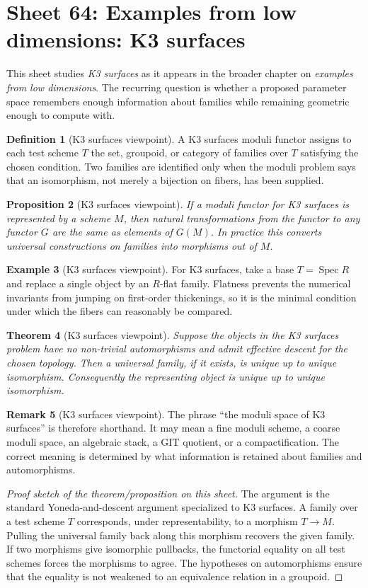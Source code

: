 \documentclass[11pt]{amsart}
\newtheorem{theorem}{Theorem}[section]
\newtheorem{proposition}[theorem]{Proposition}
\theoremstyle{definition}
\newtheorem{definition}[theorem]{Definition}
\newtheorem{example}[theorem]{Example}
\newtheorem{remark}[theorem]{Remark}
\newcommand{\Spec}{\operatorname{Spec}}
\begin{document}
\section{Sheet 64: Examples from low dimensions: K3 surfaces}
This sheet studies \emph{K3 surfaces} as it appears in the broader chapter on \emph{examples from low dimensions}.  The recurring question is whether a proposed parameter space remembers enough information about families while remaining geometric enough to compute with.
\begin{definition}[K3 surfaces viewpoint]
A K3 surfaces moduli functor assigns to each test scheme $T$ the set, groupoid, or category of families over $T$ satisfying the chosen condition.  Two families are identified only when the moduli problem says that an isomorphism, not merely a bijection on fibers, has been supplied.
\end{definition}
\begin{proposition}[K3 surfaces viewpoint]
If a moduli functor for K3 surfaces is represented by a scheme $M$, then natural transformations from the functor to any functor $G$ are the same as elements of $G(M)$.  In practice this converts universal constructions on families into morphisms out of $M$.
\end{proposition}
\begin{example}[K3 surfaces viewpoint]
For K3 surfaces, take a base $T=\Spec R$ and replace a single object by an $R$-flat family.  Flatness prevents the numerical invariants from jumping on first-order thickenings, so it is the minimal condition under which the fibers can reasonably be compared.
\end{example}
\begin{theorem}[K3 surfaces viewpoint]
Suppose the objects in the K3 surfaces problem have no non-trivial automorphisms and admit effective descent for the chosen topology.  Then a universal family, if it exists, is unique up to unique isomorphism.  Consequently the representing object is unique up to unique isomorphism.
\end{theorem}
\begin{remark}[K3 surfaces viewpoint]
The phrase ``the moduli space of K3 surfaces'' is therefore shorthand.  It may mean a fine moduli scheme, a coarse moduli space, an algebraic stack, a GIT quotient, or a compactification.  The correct meaning is determined by what information is retained about families and automorphisms.
\end{remark}
\begin{proof}[Proof sketch of the theorem/proposition on this sheet]
The argument is the standard Yoneda-and-descent argument specialized to K3 surfaces.  A family over a test scheme $T$ corresponds, under representability, to a morphism $T\to M$.  Pulling the universal family back along this morphism recovers the given family.  If two morphisms give isomorphic pullbacks, the functorial equality on all test schemes forces the morphisms to agree.  The hypotheses on automorphisms ensure that the equality is not weakened to an equivalence relation in a groupoid.
\end{proof}
\end{document}
